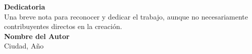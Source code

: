
\thispagestyle{empty} %

\begin{center}
    \vspace*{2cm}

    {\Huge \textbf{Dedicatoria}} \\[1.5cm]
    {\large Una breve nota para reconocer y dedicar el trabajo, aunque no necesariamente contribuyentes directos en la creación.} \\[1.5cm]

    \vspace*{3cm}
    {\large \textbf{Nombre del Autor}} \\[1.0cm]
    {\large Ciudad, Año}

\end{center}

\vfill
\clearpage
